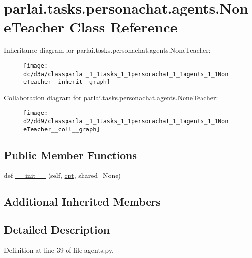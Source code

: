 \hypertarget{classparlai_1_1tasks_1_1personachat_1_1agents_1_1NoneTeacher}{}\section{parlai.\+tasks.\+personachat.\+agents.\+None\+Teacher Class Reference}
\label{classparlai_1_1tasks_1_1personachat_1_1agents_1_1NoneTeacher}


Inheritance diagram for parlai.\+tasks.\+personachat.\+agents.\+None\+Teacher\+:\nopagebreak
\begin{figure}[H]
\begin{center}
\leavevmode
\texttt{[image: dc/d3a/classparlai\_1\_1tasks\_1\_1personachat\_1\_1agents\_1\_1NoneTeacher\_\_inherit\_\_graph]}
\end{center}
\end{figure}


Collaboration diagram for parlai.\+tasks.\+personachat.\+agents.\+None\+Teacher\+:\nopagebreak
\begin{figure}[H]
\begin{center}
\leavevmode
\texttt{[image: d2/dd9/classparlai\_1\_1tasks\_1\_1personachat\_1\_1agents\_1\_1NoneTeacher\_\_coll\_\_graph]}
\end{center}
\end{figure}
\subsection*{Public Member Functions}
\begin{DoxyCompactItemize}
\item 
def \hyperlink{classparlai_1_1tasks_1_1personachat_1_1agents_1_1NoneTeacher_af7f3226c57f6d0c8fce6d670b03a4c2a}{\+\_\+\+\_\+init\+\_\+\+\_\+} (self, \hyperlink{classparlai_1_1core_1_1teachers_1_1FbDialogTeacher_af7a9ec497b9cd0292d7b8fa220da7c28}{opt}, shared=None)
\end{DoxyCompactItemize}
\subsection*{Additional Inherited Members}


\subsection{Detailed Description}


Definition at line 39 of file agents.\+py.



